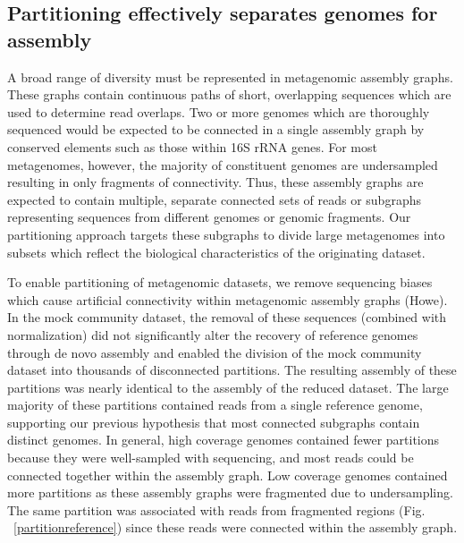 \documentclass[11pt]{article} %
\begin{document}
\subsection{Partitioning effectively separates genomes for assembly}

A broad range of diversity must be represented in metagenomic assembly graphs.   These graphs contain continuous paths of short, overlapping sequences which are used to determine read overlaps.  Two or more genomes which are thoroughly sequenced would be expected to be connected in a single assembly graph by conserved elements such as those within 16S rRNA genes.  For most metagenomes, however, the majority of constituent genomes are undersampled resulting in only fragments of connectivity.  Thus, these assembly graphs are expected to contain multiple, separate connected sets of reads or subgraphs representing sequences from different genomes or genomic fragments.  Our partitioning approach targets these subgraphs to divide large metagenomes into subsets which reflect the biological characteristics of the originating dataset.  

To enable partitioning of metagenomic datasets, we remove sequencing biases which cause artificial connectivity within metagenomic assembly graphs (Howe).  In the mock community dataset, the removal of these sequences (combined with normalization) did not significantly alter the recovery of reference genomes through de novo assembly and enabled the division of the mock community dataset into thousands of disconnected partitions.  The resulting assembly of these partitions was nearly identical to the assembly of the reduced dataset.  The large majority of these partitions  contained reads from a single reference genome, supporting our previous hypothesis that most connected subgraphs contain distinct genomes.  In general, high coverage genomes contained fewer partitions because they were well-sampled with sequencing, and most reads could be connected together within the assembly graph.  Low coverage genomes contained more partitions as these assembly graphs were fragmented due to undersampling.  The same partition was associated with reads from fragmented regions (Fig. ~\ref{partitionreference}) since these reads were connected within the assembly graph.  
\end{document}
